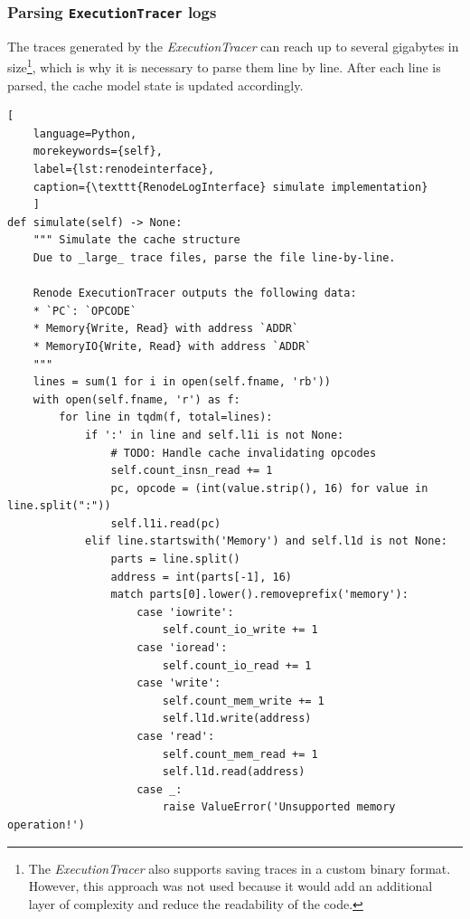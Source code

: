 \subsubsection*{Parsing \texttt{ExecutionTracer} logs}

The traces generated by the \textit{ExecutionTracer} can reach up to several gigabytes in size\footnote{The \textit{ExecutionTracer} also supports saving traces in a custom binary format. However,
this approach was not used because it would add an additional layer of complexity and reduce the readability of the code.}, which is why it is necessary to parse them line by line. 
After each line is parsed, the cache model state is updated accordingly.

\begin{center}
\centering
\begin{minipage}{\linewidth}
\begin{lstlisting}[
    language=Python,
	morekeywords={self},
    label={lst:renodeinterface},
    caption={\texttt{RenodeLogInterface} simulate implementation}
    ]
def simulate(self) -> None:
    """ Simulate the cache structure
    Due to _large_ trace files, parse the file line-by-line.

    Renode ExecutionTracer outputs the following data:
    * `PC`: `OPCODE`
    * Memory{Write, Read} with address `ADDR`
    * MemoryIO{Write, Read} with address `ADDR`
    """
    lines = sum(1 for i in open(self.fname, 'rb'))
    with open(self.fname, 'r') as f:
        for line in tqdm(f, total=lines):
            if ':' in line and self.l1i is not None:
                # TODO: Handle cache invalidating opcodes
                self.count_insn_read += 1
                pc, opcode = (int(value.strip(), 16) for value in line.split(":"))
                self.l1i.read(pc)
            elif line.startswith('Memory') and self.l1d is not None:
                parts = line.split()
                address = int(parts[-1], 16)
                match parts[0].lower().removeprefix('memory'):
                    case 'iowrite':
                        self.count_io_write += 1
                    case 'ioread':
                        self.count_io_read += 1
                    case 'write':
                        self.count_mem_write += 1
                        self.l1d.write(address)
                    case 'read':
                        self.count_mem_read += 1
                        self.l1d.read(address)
                    case _:
                        raise ValueError('Unsupported memory operation!')
\end{lstlisting}
\end{minipage}
\end{center}

